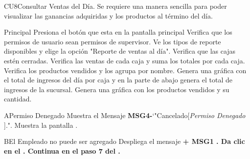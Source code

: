 \begin{UseCase}{CU8}{Consultar Ventas del Día.}{
		Se requiere una manera sencilla para poder visualizar las ganancias adquiridas y los productos al término del día.
	}
	\end{UseCase}
	\begin{UCtrayectoria}{Principal}
		\UCpaso [\UCactor] Presiona el botón  que esta en la pantalla principal 
		\UCpaso Verifica que los permisos de usuario sean permisos de supervisor. 
		\UCpaso[\UCactor] Ve los tipos de reporte disponibles y elige la opción "Reporte de ventas al día".
		\UCpaso Verifica que las cajas estén cerradas. 
		\UCpaso \UCpaso Verifica las ventas de cada caja y suma los totales por cada caja.
		\UCpaso \UCpaso Verifica los productos vendidos y los agrupa por nombre.
		\UCpaso \UCpaso Genera una gráfica con el total de ingresos del día por caja y en la parte de abajo genera el total de ingresos de la sucursal.
		\UCpaso \UCpaso Genera una gráfica con los productos vendidos y su cantidad.
	\end{UCtrayectoria}

	\begin{UCtrayectoriaA}{A}{Permiso Denegado}
			\UCpaso Muestra el Mensaje {\bf MSG4-}`"Cancelado[{\em Permiso Denegado }].".
			\UCpaso Muestra la pantalla .
		\end{UCtrayectoriaA}
		\begin{UCtrayectoriaA}{B}{El Empleado no puede ser agregado}
			\UCpaso Despliega el mensaje \bf {+ MSG1 }.
			\UCpaso[\UCactor] Da clic en el .
			\UCpaso Continua en el paso 7 del .
		\end{UCtrayectoriaA}

